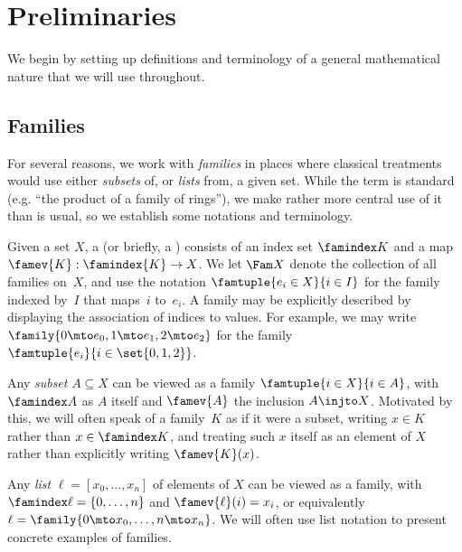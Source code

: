 \section{Preliminaries}
\label{sec:preliminaries}

We begin by setting up definitions and terminology of a general mathematical nature that we will use throughout.

\subsection{Families}

For several reasons, we work with \emph{families} in places where classical treatments would use either \emph{subsets} of, or \emph{lists} from, a given set.
%
While the term is standard (e.g. ``the product of a family of rings''), we make rather more central use of it than is usual, so we establish some notations and terminology.

\begin{definition}
  \label{def:family}%
  Given a set $X$, a  (or briefly, a ) consists of an index set $\famindex K$ and a map $\famev{K} : \famindex{K} \to X$.
  We let $\Fam X$ denote the collection of all families on~$X$, and use the  notation $\famtuple{e_i \in X}{i \in I}$ for the family indexed by~$I$ that maps~$i$ to~$e_i$. A family may be explicitly described by displaying the association of indices to values. For example, we may write $\family{0 \mto e_0, 1 \mto e_1, 2 \mto e_2}$ for the family $\famtuple{e_i}{i \in \set{0,1,2}}$.
\end{definition}

\begin{example}
  Any \emph{subset} $A \subseteq X$ can be viewed as a family $\famtuple{i \in X}{i \in A}$, with $\famindex A$ as $A$ itself and $\famev{A}$ the inclusion $A \injto X$.
  Motivated by this, we will often speak of a family~$K$ as if it were a subset, writing $x \in K$ rather than $x \in \famindex K$, and treating such $x$ itself as an element of $X$ rather than explicitly writing $\famev{K}(x)$.
\end{example}

\begin{example}
  Any \emph{list} $\ell = [x_0,\ldots,x_n]$ of elements of $X$ can be viewed as a family, with $\famindex \ell = \{ 0, \ldots, n \}$ and $\famev{\ell}(i) = x_i$, or equivalently $\ell = \family{0 \mto x_0, \ldots, n \mto x_n}$.
  We will often use list notation to present concrete examples of families.
\end{example}

